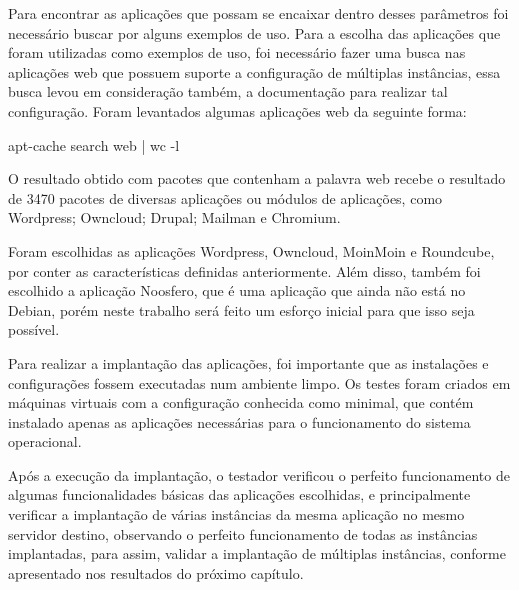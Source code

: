 Para encontrar as aplicações que possam se encaixar dentro desses parâmetros foi necessário buscar por alguns exemplos de uso. Para a escolha das aplicações que
foram utilizadas como exemplos de uso, foi necessário fazer uma busca nas aplicações
web  que possuem suporte a configuração de múltiplas
instâncias, essa busca levou em consideração também, a documentação para realizar
tal configuração. Foram levantados algumas aplicações web da seguinte forma:

\begin{center}
apt-cache search web | wc -l
\end{center}

O resultado obtido com pacotes que contenham a palavra web recebe o resultado de 3470
pacotes de diversas aplicações ou módulos de aplicações, como
Wordpress; Owncloud; Drupal; Mailman e Chromium.
 
Foram escolhidas as aplicações Wordpress, Owncloud, MoinMoin
e Roundcube, por conter as características definidas anteriormente. Além disso,
também foi escolhido a aplicação Noosfero, que é uma aplicação que ainda não
está no Debian, porém neste trabalho será feito um esforço inicial para que isso
seja possível.

Para realizar a implantação das aplicações, foi importante que as 
instalações e configurações
fossem executadas num ambiente limpo. Os testes foram criados
em máquinas virtuais com a configuração conhecida como minimal, que contém
instalado apenas as aplicações necessárias para o funcionamento do sistema operacional.

Após a execução da implantação, o testador verificou o perfeito
funcionamento de algumas funcionalidades básicas das aplicações escolhidas,
e principalmente verificar a implantação de várias instâncias da mesma
aplicação no mesmo servidor destino, observando o perfeito funcionamento de todas as
instâncias implantadas, para assim, validar a implantação de múltiplas instâncias, conforme
apresentado nos resultados do próximo capítulo.
